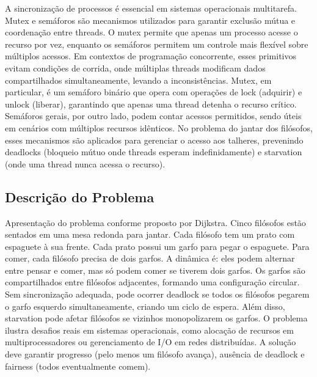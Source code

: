 A sincronização de processos é essencial em sistemas operacionais multitarefa. Mutex e semáforos são mecanismos utilizados para garantir exclusão mútua e coordenação entre threads. O mutex permite que apenas um processo acesse o recurso por vez, enquanto os semáforos permitem um controle mais flexível sobre múltiplos acessos. Em contextos de programação concorrente, esses primitivos evitam condições de corrida, onde múltiplas threads modificam dados compartilhados simultaneamente, levando a inconsistências. Mutex, em particular, é um semáforo binário que opera com operações de lock (adquirir) e unlock (liberar), garantindo que apenas uma thread detenha o recurso crítico. Semáforos gerais, por outro lado, podem contar acessos permitidos, sendo úteis em cenários com múltiplos recursos idênticos. No problema do jantar dos filósofos, esses mecanismos são aplicados para gerenciar o acesso aos talheres, prevenindo deadlocks (bloqueio mútuo onde threads esperam indefinidamente) e starvation (onde uma thread nunca acessa o recurso).

\subsection{Descrição do Problema}
Apresentação do problema conforme proposto por Dijkstra. Cinco filósofos estão sentados em uma mesa redonda para jantar. Cada filósofo tem um prato com espaguete à sua frente. Cada prato possui um garfo para pegar o espaguete. Para comer, cada filósofo precisa de dois garfos. A dinâmica é: eles podem alternar entre pensar e comer, mas só podem comer se tiverem dois garfos. Os garfos são compartilhados entre filósofos adjacentes, formando uma configuração circular. Sem sincronização adequada, pode ocorrer deadlock se todos os filósofos pegarem o garfo esquerdo simultaneamente, criando um ciclo de espera. Além disso, starvation pode afetar filósofos se vizinhos monopolizarem os garfos. O problema ilustra desafios reais em sistemas operacionais, como alocação de recursos em multiprocessadores ou gerenciamento de I/O em redes distribuídas. A solução deve garantir progresso (pelo menos um filósofo avança), ausência de deadlock e fairness (todos eventualmente comem).
